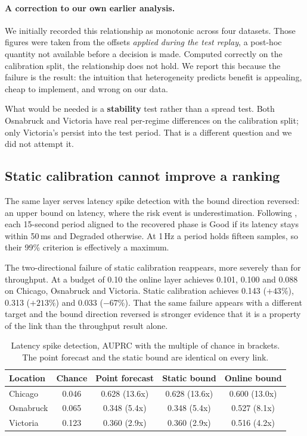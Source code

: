 \documentclass[acmsmall,screen]{acmart}
\begin{document}
\paragraph{A correction to our own earlier analysis.} We initially recorded this relationship as monotonic across four datasets. Those figures were taken from the offsets \emph{applied during the test replay}, a post-hoc quantity not available before a decision is made. Computed correctly on the calibration split, the relationship does not hold. We report this because the failure is the result: the intuition that heterogeneity predicts benefit is appealing, cheap to implement, and wrong on our data.

What would be needed is a \textbf{stability} test rather than a spread test. Both Osnabruck and Victoria have real per-regime differences on the calibration split; only Victoria's persist into the test period. That is a different question and we did not attempt it.

\subsection{Static calibration cannot improve a ranking}
\label{sec:latency}

The same layer serves latency spike detection with the bound direction reversed: an upper bound on latency, where the risk event is underestimation. Following \citet{casparsen2026latency}, each 15-second period aligned to the recovered phase is Good if its latency stays within 50\,ms and Degraded otherwise. At 1\,Hz a period holds fifteen samples, so their 99\% criterion is effectively a maximum.

The two-directional failure of static calibration reappears, more severely than for throughput. At a budget of 0.10 the online layer achieves 0.101, 0.100 and 0.088 on Chicago, Osnabruck and Victoria. Static calibration achieves 0.143 ($+43\%$), 0.313 ($+213\%$) and 0.033 ($-67\%$). That the same failure appears with a different target and the bound direction reversed is stronger evidence that it is a property of the link than the throughput result alone.

\begin{table}[t]
\caption{Latency spike detection, AUPRC with the multiple of chance in brackets. The point forecast and the static bound are identical on every link.}
\label{tab:auprc}
\begin{tabular}{lcccc}
\toprule
Location & Chance & Point forecast & Static bound & Online bound \\
\midrule
Chicago & 0.046 & 0.628 (13.6x) & 0.628 (13.6x) & 0.600 (13.0x) \\
Osnabruck & 0.065 & 0.348 (5.4x) & 0.348 (5.4x) & 0.527 (8.1x) \\
Victoria & 0.123 & 0.360 (2.9x) & 0.360 (2.9x) & 0.516 (4.2x) \\
\bottomrule
\end{tabular}
\end{table}
\end{document}
